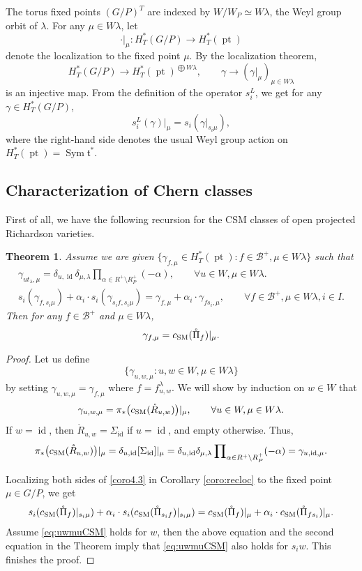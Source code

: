 \documentclass[12pt]{amsart}
\newtheorem{Th}{Theorem}[section]
\def\CSM{c_{\rm SM}}
\def\id{\operatorname{id}}
\def\pt{\operatorname{pt}}
\def\Sym{\operatorname{Sym}}
\begin{document}
The torus fixed points $(G/P)^T$ are indexed by $W/W_P\simeq W\lambda$, the Weyl group orbit of $\lambda$.
For any $\mu\in W\lambda$, let 
$$\cdot|_\mu: H_T^*(G/P)\longrightarrow H_T^*(\pt)$$
denote the localization to the fixed point $\mu$. 
By the localization theorem,
$$H_T^*(G/P)\longrightarrow H_T^*(\pt)^{\bigoplus W\lambda},\qquad \gamma\longrightarrow (\gamma|_\mu)_{\mu\in W\lambda}$$
is an injective map. From the definition of the operator $s_i^L$, we get for any $\gamma\in H_T^*(G/P)$,
\[s_i^L(\gamma)|_\mu = s_i(\gamma|_{s_i\mu}),\]
where the right-hand side denotes the usual Weyl group action on $H_T^*(\pt)=\Sym \mathfrak{t}^*$.

\subsection{Characterization of Chern classes}
First of all, we have the following recursion for the CSM classes of   open projected Richardson varieties.
\begin{Th}\label{themorem4.1}
Assume we are given 
$\{\gamma_{f,\mu}\in H_T^*(\pt): f\in \mathcal{B}^+,\mu\in W\lambda\}$
such that 
\begin{gather*}
\label{eq:CSMPRchar1}
\gamma_{ut_\lambda,\mu}=\delta_{u,\id}\delta_{\mu,\lambda}
\prod\nolimits_{\alpha\in R^+\setminus R_P^+}(-\alpha),
\qquad \forall u\in W,\mu\in W\lambda.
\\
\label{eq:CSMPRchar2}
s_i(\gamma_{f,s_i\mu})
+\alpha_i\cdot s_i(\gamma_{s_if,s_i\mu})
= \gamma_{f,\mu}
+\alpha_i\cdot \gamma_{fs_i,\mu},
\qquad \forall f\in \mathcal{B}^+,\mu\in W\lambda, i\in I.
\end{gather*}
Then for any $f\in \mathcal{B}^+$ and $\mu\in W\lambda$,
$$\gamma_{f,\mu}=\CSM(\mathring{\Pi}_f)|_\mu.$$
\end{Th}
\begin{proof}
Let us define
$$\{\gamma_{u,w,\mu}:u,w\in W,\mu\in W\lambda\}$$
by setting $\gamma_{u,w,\mu}= \gamma_{f,\mu}$ where $f=f^\lambda_{u,w}$. 
We will show by induction on $w\in W$ that 
\begin{equation}\label{eq:uwmuCSM}
\gamma_{u,w,\mu}=\pi_*\big(\CSM(\mathring{R}_{u,w})\big)|_{\mu},
\qquad \forall u\in W,\mu\in W\lambda.
\end{equation}
If $w=\id$, then $\mathring{R}_{u,w}=\Sigma_{\id}$ if $u=\id$, and empty otherwise. Thus, 
\[\pi_*\big(\CSM(\mathring{R}_{u,w})\big)|_{\mu}=\delta_{u,\id}[\Sigma_{\id}]|_{\mu}=\delta_{u,\id}\delta_{\mu,\lambda}
\prod\nolimits_{\alpha\in R^+\setminus R_P^+}(-\alpha)=\gamma_{u,\id,\mu}.\]

Localizing both sides of \eqref{coro4.3} in Corollary \ref{coro:recloc} to the fixed point $\mu\in G/P$, we get
$$
s_i(\CSM(\mathring{\Pi}_f)|_{s_i\mu})
+\alpha_i\cdot s_i(\CSM(\mathring{\Pi}_{s_if})|_{s_i\mu})
= \CSM(\mathring{\Pi}_f)|_{\mu}
+\alpha_i\cdot \CSM(\mathring{\Pi}_{fs_i})|_{\mu}. 
$$
Assume  \eqref{eq:uwmuCSM} holds for $w$, then the above equation and the second equation in the Theorem imply that  \eqref{eq:uwmuCSM} also holds for $s_iw$. This finishes the proof.
\end{proof}
\end{document}

